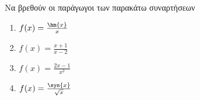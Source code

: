 Να βρεθούν οι παράγωγοι των παρακάτω συναρτήσεων
\begin{enumerate}
\item $ f(x)=\frac{\hm{x}}{x} $
\item $ f(x)=\frac{x+1}{x-2} $
\item $ f(x)=\frac{2x-1}{x^2} $
\item $ f(x)=\frac{\syn{x}}{\sqrt{x}} $
\end{enumerate}
